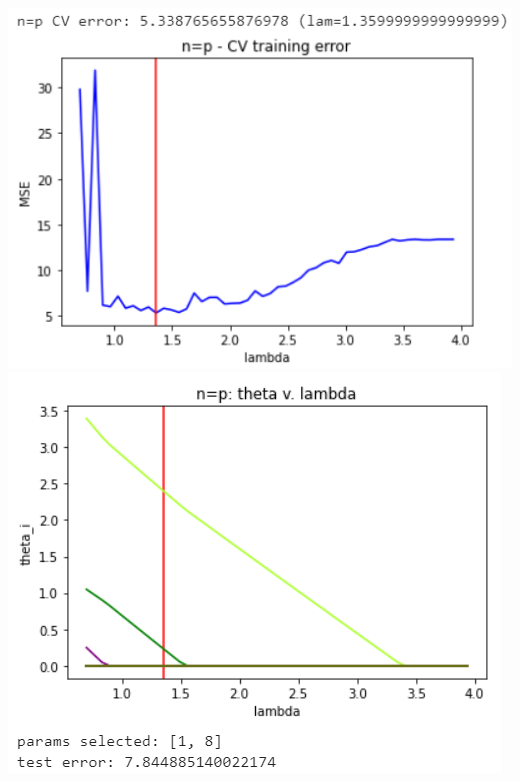 \documentclass[11pt]{article}
\begin{document}
\begin{center}
\includegraphics[scale=0.7]{charts/ridge_st_ortho_n_eq_p_err.PNG}
\includegraphics[scale=0.7]{charts/ridge_st_ortho_n_eq_p_thetas.PNG}


\end{center}
\end{document}
